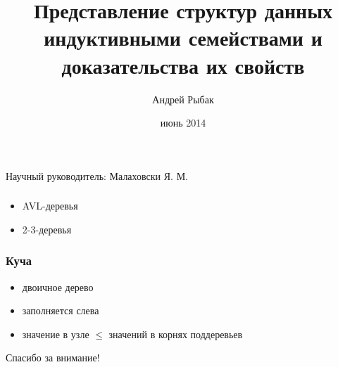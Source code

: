 \documentclass[17pt]{beamer}
\title{Представление структур данных индуктивными семействами и доказательства их свойств}
\institute{НИУ ИТМО}
\author{Андрей Рыбак}
\date{
июнь 2014
}
\begin{document}
{
\fontsize{14pt}{14pt}\selectfont
{}
\begin{frame}
  \maketitle
  \begin{flushright}
    Научный руководитель: Малаховски Я. М.
  \end{flushright}
\end{frame}
}


\begin{frame}
    \frametitle{}
    \begin{itemize}
        \item AVL-деревья
        \item 2-3-деревья
    \end{itemize}
\end{frame}

\AgdaHide{

}

\begin{frame}
    \frametitle{Куча}
    \begin{itemize}
        \item двоичное дерево
        \item заполняется слева
        \item значение в узле $ \leq $ значений в корнях поддеревьев
    \end{itemize}
\end{frame}

\fontsize{14pt}{14pt}\selectfont


\begin{frame}
    \begin{center}
        \Large Спасибо за внимание!
    \end{center}
\end{frame}
\end{document}
